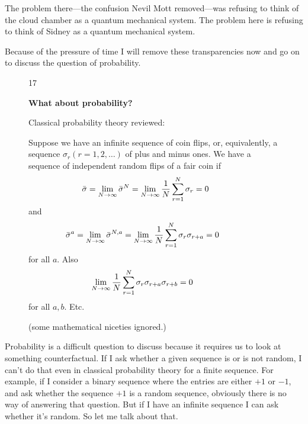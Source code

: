 \documentclass[12pt,nofootinbib]{revtex4}
\begin{document}
The problem there---the confusion Nevil Mott removed---was refusing to think of the cloud chamber as a quantum mechanical system. The problem here is refusing to think of Sidney as a quantum mechanical system.

Because of the pressure of time I will remove these transparencies now and go on to discuss the question of probability.

\begin{figure}[htb] 
\begin{mdframed}
  \vspace{5pt}\hfill 17\\[-18pt]
  \begin{center}
    \textbf{What about probability?} 
  \end{center}
  \begin{raggedright}
    Classical probability theory reviewed:

    Suppose we have an infinite sequence of coin flips, or, equivalently, a sequence $\sigma_r (r=1,2,\ldots )$ of plus and minus ones.  We have a sequence of independent random flips of a fair coin if
    \begin{align}\nonumber
      &\hspace{-20pt}
        \bar\sigma =\lim_{N\to\infty}\bar\sigma^N=
        \lim_{N\to\infty}\frac{1}{N}\sum_{r=1}^N\sigma_r=0
      \\[-18pt]\nonumber
    \end{align}
    and\vspace{-5pt}
    \begin{align}\nonumber
      &\hspace{-18pt}
        \bar\sigma^a =\lim_{N\to\infty}\bar\sigma^{N,a}=
        \lim_{N\to\infty}\frac{1}{N}\sum_{r=1}^N\sigma_r\sigma_{r+a}=0
    \end{align}
    for all $a$. Also
    \begin{align}\nonumber
      &\hspace{-20pt}
        \lim_{N\to\infty}\frac{1}{N}
        \sum_{r=1}^N\sigma_r\sigma_{r+a}\sigma_{r+b}=0
    \end{align}
    for all $a,b$. Etc.

    (some mathematical niceties ignored.)
  \end{raggedright}
\vspace{.5\baselineskip}
\end{mdframed}
\end{figure}


Probability is a difficult question to discuss because it requires us to look at something counterfactual. %
If I ask whether a given sequence is or is not random, I can't do that even in classical probability theory for a finite sequence. For example, if I consider a binary sequence where the entries are either $+1$ or $-1$, and ask whether the sequence $+1$ is a random sequence, obviously there is no way of answering that question. But if I have an infinite sequence I can ask whether it's random. So let me talk about that.
\end{document}
